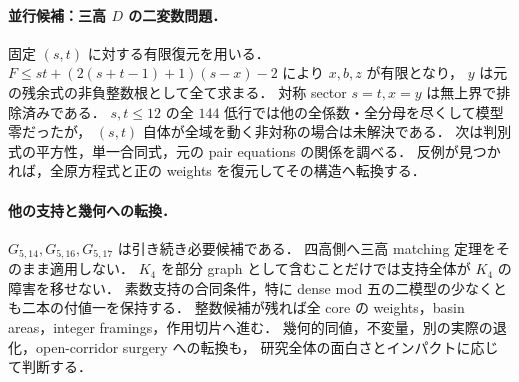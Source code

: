 \paragraph{並行候補：三高 $D$ の二変数問題．}
固定 $(s,t)$ に対する有限復元を用いる．
$F\le st+(2(s+t-1)+1)(s-x)-2$ により $x,b,z$ が有限となり，
$y$ は元の残余式の非負整数根として全て求まる．
対称 sector $s=t,x=y$ は無上界で排除済みである．
$s,t\le12$ の全 $144$ 低行では他の全係数・全分母を尽くして模型零だったが，
$(s,t)$ 自体が全域を動く非対称の場合は未解決である．
次は判別式の平方性，単一合同式，元の pair equations の関係を調べる．
反例が見つかれば，全原方程式と正の weights を復元してその構造へ転換する．

\paragraph{他の支持と幾何への転換．}
$G_{5,14},G_{5,16},G_{5,17}$ は引き続き必要候補である．
四高側へ三高 matching 定理をそのまま適用しない．
$K_4$ を部分 graph として含むことだけでは支持全体が $K_4$ の障害を移せない．
素数支持の合同条件，特に dense mod 五の二模型の少なくとも二本の付値一を保持する．
整数候補が残れば全 core の weights，basin areas，integer framings，作用切片へ進む．
幾何的同値，不変量，別の実際の退化，open-corridor surgery への転換も，
研究全体の面白さとインパクトに応じて判断する．
